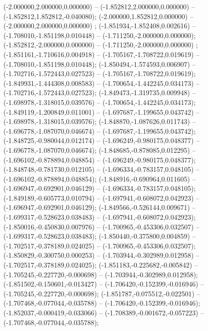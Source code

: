  (-2.000000,2.000000,0.000000) -- (-1.852812,2.000000,0.000000) -- (-1.852812,1.852812,-0.040080);
 (-2.000000,1.852812,0.000000) -- (-2.000000,2.000000,0.000000) ;
 (-1.851934,-1.852408,0.002616) -- (-1.708010,-1.851198,0.010448) -- (-1.711250,-2.000000,0.000000);
 (-1.852812,-2.000000,0.000000) -- (-1.711250,-2.000000,0.000000) ;
 (-1.851161,-1.710616,0.004918) -- (-1.705167,-1.708722,0.019619) -- (-1.708010,-1.851198,0.010448);
 (-1.850494,-1.574593,0.006907) -- (-1.702716,-1.572443,0.027523) -- (-1.705167,-1.708722,0.019619);
 (-1.849931,-1.444308,0.008583) -- (-1.700654,-1.442245,0.034173) -- (-1.702716,-1.572443,0.027523);
 (-1.849473,-1.319735,0.009948) -- (-1.698978,-1.318015,0.039576) -- (-1.700654,-1.442245,0.034173);
 (-1.849119,-1.200849,0.011001) -- (-1.697687,-1.199655,0.043742) -- (-1.698978,-1.318015,0.039576);
 (-1.848870,-1.087626,0.011743) -- (-1.696778,-1.087070,0.046674) -- (-1.697687,-1.199655,0.043742);
 (-1.848725,-0.980044,0.012174) -- (-1.696249,-0.980175,0.048377) -- (-1.696778,-1.087070,0.046674);
 (-1.848685,-0.878085,0.012295) -- (-1.696102,-0.878894,0.048854) -- (-1.696249,-0.980175,0.048377);
 (-1.848748,-0.781730,0.012105) -- (-1.696334,-0.783157,0.048105) -- (-1.696102,-0.878894,0.048854);
 (-1.848916,-0.690964,0.011605) -- (-1.696947,-0.692901,0.046129) -- (-1.696334,-0.783157,0.048105);
 (-1.849189,-0.605773,0.010794) -- (-1.697941,-0.608072,0.042923) -- (-1.696947,-0.692901,0.046129);
 (-1.849566,-0.526144,0.009671) -- (-1.699317,-0.528623,0.038483) -- (-1.697941,-0.608072,0.042923);
 (-1.850016,-0.450830,0.007976) -- (-1.700965,-0.453306,0.032507) -- (-1.699317,-0.528623,0.038483);
 (-1.850440,-0.375800,0.004859) -- (-1.702517,-0.378189,0.024025) -- (-1.700965,-0.453306,0.032507);
 (-1.850829,-0.300750,0.000253) -- (-1.703944,-0.302989,0.012958) -- (-1.702517,-0.378189,0.024025);
 (-1.851183,-0.225682,-0.005842) -- (-1.705245,-0.227720,-0.000698) -- (-1.703944,-0.302989,0.012958);
 (-1.851502,-0.150601,-0.013427) -- (-1.706420,-0.152399,-0.016946) -- (-1.705245,-0.227720,-0.000698);
 (-1.851787,-0.075512,-0.022501) -- (-1.707468,-0.077044,-0.035788) -- (-1.706420,-0.152399,-0.016946);
 (-1.852037,-0.000419,-0.033066) -- (-1.708389,-0.001672,-0.057223) -- (-1.707468,-0.077044,-0.035788);
